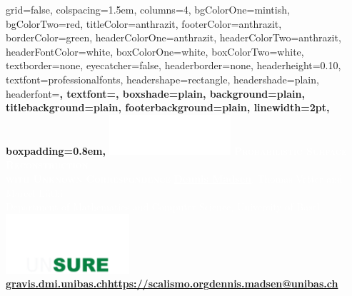 \documentclass[portrait,final,paperwidth=84.10cm, paperheight=118.90cm,showframe fontscale=0.277,margin=1.5cm]{baposter}
\begin{document}

\begin{poster}%
	{
		grid=false,
		colspacing=1.5em,
		columns=4,
		bgColorOne=mintish,
		bgColorTwo=red,
		titleColor=anthrazit,
		footerColor=anthrazit,
		borderColor=green,
		headerColorOne=anthrazit,
		headerColorTwo=anthrazit,
		headerFontColor=white,
		boxColorOne=white,
		boxColorTwo=white,
		textborder=none,
		eyecatcher=false,
		headerborder=none,
		headerheight=0.10\textheight,
		textfont=professionalfonts, %
		headershape=rectangle, %
		headershade=plain, %
		headerfont=\large\bf\textsc, %
		textfont={\setlength{\parindent}{1.5em}},
		boxshade=plain,
		background=plain, %
		titlebackground=plain, %
		footerbackground=plain, %
		linewidth=2pt,
		boxpadding=0.8em,
	}
	{
		\includegraphics[height=4.0em]{logo/UniBas_Logo_EN_Weiss_Trans_RGB_55}
	} 
	{\textcolor{white}{\Huge\bf\textsc{Probabilistic Surface Reconstruction \\with Unknown Correspondence}}\vspace{0.2em}}
	{\textcolor{white}{\normalsize{
				\hspace{-0.2em}\textbf{\underline{Dennis Madsen}}, Thomas Vetter and Marcel Lüthi\\
				Department of Mathematics and Computer Science, University of Basel
			}
		}
	}
	{%
			\includegraphics[height=6.0em]{logo/UniBas_Logo_EN_Weiss_Trans_RGB_55_UNSURE}
	}
	{
		{\textcolor{lightgray}{\normalsize{\bf{
						\noindent \url{gravis.dmi.unibas.ch}\hfill \url{https://scalismo.org}\hfill \href{mailto:dennis.madsen@unibas.ch}{dennis.madsen@unibas.ch} 
					}
				}
			}
		}
	}
	

\end{poster}
\end{document}
